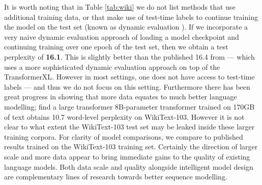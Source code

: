 \documentclass{article} \usepackage{iclr2020_conference,times}
\begin{document}
It is worth noting that in Table \ref{tab:wiki} we do not list methods that use additional training data, or that make use of test-time labels to continue training the model on the test set (known as dynamic evaluation \citep{graves2013generating}). If we incorporate a very naive dynamic evaluation approach of loading a model checkpoint and continuing training over one epoch of the test set, then we obtain a test perplexity of \textbf{16.1}. This is slightly better than the published 16.4 from \cite{krause2019dynamic} --- which uses a more sophisticated dynamic evaluation approach on top of the TransformerXL. However in most settings, one does not have access to test-time labels --- and thus we do not focus on this setting. Furthermore there has been great progress in showing that more data equates to much better language modelling; \cite{shoeybi2019megatronlm} find a large transformer 8B-parameter transformer trained on 170GB of text obtains 10.7 word-level perplexity on WikiText-103. However it is not clear to what extent the WikiText-103 test set may be leaked inside these larger training corpora. For clarity of model comparisons, we compare to published results trained on the WikiText-103 training set. Certainly the direction of larger scale and more data appear to bring immediate gains to the quality of existing language models. Both data scale and quality alongside intelligent model design are complementary lines of research towards better sequence modelling.
\end{document}
